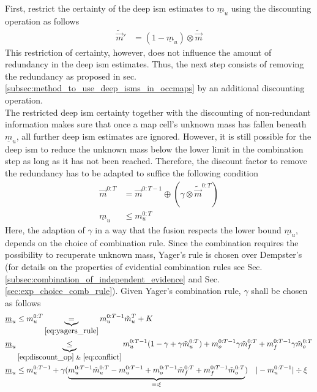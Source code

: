 \\
First, restrict the certainty of the deep \gls{ism} estimates to $\underline{m}_u$ using the discounting operation as follows
\begin{align}
	\tilde{\vec{m}}' &= (1-\underline{m}_u) \otimes \tilde{\vec{m}}
\end{align}
This restriction of certainty, however, does not influence the amount of redundancy in the deep \gls{ism} estimates. Thus, the next step consists of removing the redundancy as proposed in sec. \ref{subsec:method_to_use_deep_isms_in_occmaps} by an additional discounting operation.\\
The restricted deep \gls{ism} certainty together with the discounting of non-redundant information makes sure that once a map cell's unknown mass has fallen beneath $\underline{m}_u$, all further deep \gls{ism} estimates are ignored. However, it is still possible for the deep \gls{ism} to reduce the unknown mass below the lower limit in the combination step as long as it has not been reached. Therefore, the discount factor to remove the redundancy has to be adapted to suffice the following condition
\begin{align}
	\vec{m}^{0:T} &= \vec{m}^{0:T-1} \oplus (\gamma \otimes \tilde{\vec{m}}^{0:T})\\
	\underline{m}_u &\leq m^{0:T}_{u}
\end{align} 
Here, the adaption of $\gamma$ in a way that the fusion respects the lower bound $\underline{m}_{u}$, depends on the choice of combination rule. Since the combination requires the possibility to recuperate unknown mass, Yager's rule is chosen over Dempster's (for details on the properties of evidential combination rules see Sec. \ref{subsec:combination_of_independent_evidence} and Sec. \ref{sec:exp_choice_comb_rule}). Given Yager's combination rule, $\gamma$ shall be chosen as follows
\begin{align}
	\underline{m}_u &\leq m^{0:T}_{u} \underbrace{=}_{\eqref{eq:yagers_rule}} m_{u}^{0:T-1}\tilde{m}_{u}^{T}+K \\
%
	\underline{m}_u & \underbrace{\leq}_{\eqref{eq:discount_op}\text{ \& }\eqref{eq:conflict}} m_{u}^{0:T-1}(1-\gamma+\gamma\tilde{m}_{u}^{0:T}) + m_{o}^{0:T-1}\gamma\tilde{m}_{f}^{0:T} + m_{f}^{0:T-1}\gamma\tilde{m}_{o}^{0:T}\\
%
	\underline{m}_u &\leq m_{u}^{0:T-1} + \gamma (\underbrace{m_{u}^{0:T-1}\tilde{m}_{u}^{0:T} - m_{u}^{0:T-1} + m_{o}^{0:T-1}\tilde{m}_{f}^{0:T} + m_{f}^{0:T-1}\tilde{m}_{o}^{0:T}}_{=: \xi}) \quad|-m_{u}^{0:T-1} |\div\xi
\end{align}
